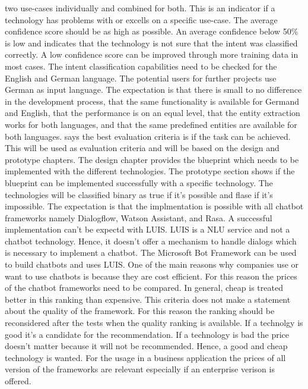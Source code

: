 two use-cases individually and combined for both.
This is an indicator if a technology has problems with or excells
on a specific use-case.
The average confidence score should be as high as possible.
An average confidence below 50\% is low and indicates 
that the technology is not sure that the intent was 
classified correctly.
A low confidence score can be improved through more training data
in most cases. 
The intent classification capabilities need to be checked for the English and German 
language.
The potential users for further projects use German as input language.
The expectation is that there is small to no difference in the development process, 
that the same functionality is available for Germand and English,
that the performance is on an equal level, that the 
entity extraction works for both languages, and that 
the same predefined entities are available for both languages.
\citet{singhbuilding} says the best evaluation criteria is if the 
task can be achieved.
This will be used as evaluation criteria and will be based on the 
design and prototype chapters.
The design chapter provides the blueprint which needs to be 
implemented with the different technologies.
The prototype section shows if the blueprint can be 
implemented successfully with a specific technology.
The technologies will be classified binary as true if it's possible and 
flase if it's impossible.
The expectation is that the implmentation is possible with 
all chatbot frameworks namely Dialogflow, Watson Assistant, and Rasa.
A successful implementation can't be expectd with LUIS.
LUIS is a NLU service and not a chatbot technology.
Hence, it doesn't offer a mechanism to handle dialogs which is 
necessary to implement a chatbot.
The Microsoft Bot Framework can be used to build chatbots 
and uses LUIS.
One of the main reasons why companies use or want to use chatbots is because they are cost efficient.
For this reason the prices of the chatbot frameworks need to be compared.
In general, cheap is treated better in this ranking than expensive.
This criteria does not make a statement about the quality of the framework.
For this reason the ranking should be reconsidered after the tests when the 
quality ranking is available.
If a technolgy is good it's a candidate for the recommendation.
If a technology is bad the price doesn't matter because it will not be recommended.
Hence, a good and cheap technology is wanted. 
For the usage in a business application the prices of all version of the frameworks are relevant 
especially if an enterprise verison is offered.

